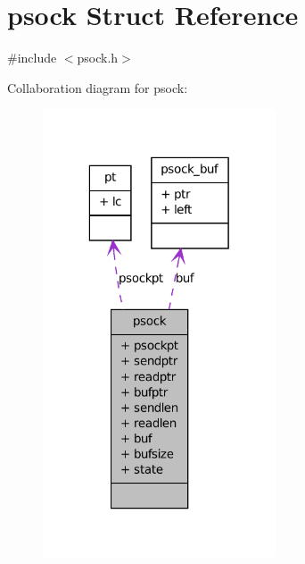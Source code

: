 \hypertarget{structpsock}{
\section{psock Struct Reference}
\label{structpsock}
}


{\ttfamily \#include $<$psock.h$>$}



Collaboration diagram for psock:
\nopagebreak
\begin{figure}[H]
\begin{center}
\leavevmode
\includegraphics[width=196pt]{structpsock__coll__graph}
\end{center}
\end{figure}
